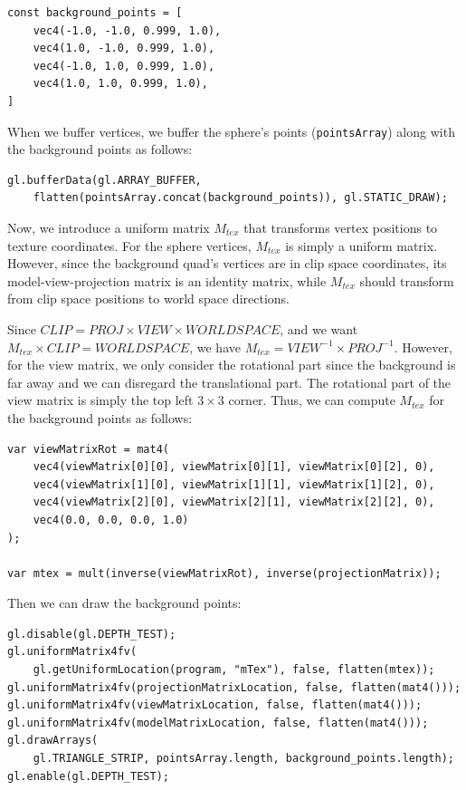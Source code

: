 \documentclass[12pt]{article}
\begin{document}
\begin{verbatim}
const background_points = [
    vec4(-1.0, -1.0, 0.999, 1.0),
    vec4(1.0, -1.0, 0.999, 1.0),
    vec4(-1.0, 1.0, 0.999, 1.0),
    vec4(1.0, 1.0, 0.999, 1.0),
]
\end{verbatim}

When we buffer vertices, we buffer the sphere's points (\texttt{pointsArray}) along with the background points as follows:

\begin{verbatim}
gl.bufferData(gl.ARRAY_BUFFER,
    flatten(pointsArray.concat(background_points)), gl.STATIC_DRAW);
\end{verbatim}

Now, we introduce a uniform matrix $M_{tex}$ that transforms vertex positions to texture coordinates. For the sphere vertices, $M_{tex}$ is simply a uniform matrix. However, since the background quad's vertices are in clip space coordinates, its model-view-projection matrix is an identity matrix, while $M_{tex}$ should transform from clip space positions to world space directions. 

Since $CLIP = PROJ \times VIEW \times WORLDSPACE$, and we want $M_{tex} \times CLIP = WORLDSPACE$, we have $M_{tex} = VIEW^{-1} \times PROJ^{-1}$. However, for the view matrix, we only consider the rotational part since the background is far away and we can disregard the translational part. The rotational part of the view matrix is simply the top left $3 \times 3$ corner. Thus, we can compute $M_{tex}$ for the background points as follows:

\begin{verbatim}
var viewMatrixRot = mat4(
    vec4(viewMatrix[0][0], viewMatrix[0][1], viewMatrix[0][2], 0),
    vec4(viewMatrix[1][0], viewMatrix[1][1], viewMatrix[1][2], 0),
    vec4(viewMatrix[2][0], viewMatrix[2][1], viewMatrix[2][2], 0),
    vec4(0.0, 0.0, 0.0, 1.0)
);

var mtex = mult(inverse(viewMatrixRot), inverse(projectionMatrix));
\end{verbatim}
\newpage
Then we can draw the background points:

\begin{verbatim}
gl.disable(gl.DEPTH_TEST);
gl.uniformMatrix4fv(
    gl.getUniformLocation(program, "mTex"), false, flatten(mtex));
gl.uniformMatrix4fv(projectionMatrixLocation, false, flatten(mat4()));
gl.uniformMatrix4fv(viewMatrixLocation, false, flatten(mat4()));
gl.uniformMatrix4fv(modelMatrixLocation, false, flatten(mat4()));
gl.drawArrays(
    gl.TRIANGLE_STRIP, pointsArray.length, background_points.length);
gl.enable(gl.DEPTH_TEST);
\end{verbatim}
\end{document}
